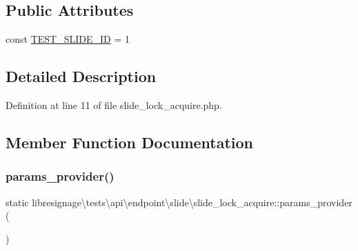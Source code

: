 \subsection*{Public Attributes}
\begin{DoxyCompactItemize}
\item 
const \hyperlink{classlibresignage_1_1tests_1_1api_1_1endpoint_1_1slide_1_1slide__lock__acquire_a1bc5291751722464978bcf870c54317c}{T\+E\+S\+T\+\_\+\+S\+L\+I\+D\+E\+\_\+\+ID} = \textquotesingle{}1\textquotesingle{}
\end{DoxyCompactItemize}


\subsection{Detailed Description}


Definition at line 11 of file slide\+\_\+lock\+\_\+acquire.\+php.



\subsection{Member Function Documentation}
\mbox{\label{classlibresignage_1_1tests_1_1api_1_1endpoint_1_1slide_1_1slide__lock__acquire_a9cf9f2d856657193d9a91ec3cbcb17c7}} 
\subsubsection{\texorpdfstring{params\+\_\+provider()}{params\_provider()}}
{\footnotesize\ttfamily static libresignage\textbackslash{}tests\textbackslash{}api\textbackslash{}endpoint\textbackslash{}slide\textbackslash{}slide\+\_\+lock\+\_\+acquire\+::params\+\_\+provider (\begin{DoxyParamCaption}{ }\end{DoxyParamCaption})\hspace{0.3cm}{\ttfamily [static]}}



